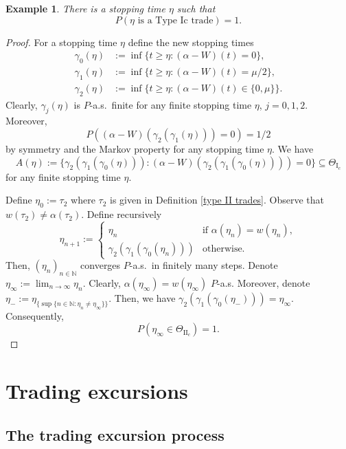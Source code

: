 \documentclass[11pt]{scrartcl}
\newtheorem{example}[theorem]{Example}
\begin{document}
\begin{example}\label{ExIc}
There is a stopping time $\eta$ such that 
\begin{equation*}
P(\eta \text{ is a Type~{Ic} trade}) = 1.
\end{equation*}
\end{example}

\begin{proof}
 For a stopping time $\eta$ define the new stopping times
  \begin{align*}
    \gamma_0(\eta) &:= \inf\{t\geq \eta: (\alpha-W)(t) = 0\}, \\
    \gamma_1(\eta) &:= \inf\{t\geq \eta: (\alpha-W)(t) = \mu/2\}, \\
    \gamma_2(\eta) &:= \inf\{t\geq \eta: (\alpha-W)(t) \in\{0,\mu\}\}.
  \end{align*}
  Clearly, $\gamma_j(\eta)$ is $P$-a.s.\ finite for any finite stopping time $\eta$, $j=0,1,2$. Moreover, $$P((\alpha-W)(\gamma_2(\gamma_1(\eta))) = 0) = 1/2$$ 
  by symmetry and the Markov property for any stopping time $\eta$. We have
$$ 
A(\eta) := \{ \gamma_2(\gamma_1(\gamma_0(\eta))):(\alpha-W)(\gamma_2(\gamma_1(\gamma_0(\eta)))) = 0 \} 
\subseteq \Theta_{\mathrm{I}_c}
$$
for any finite stopping time $\eta$. 
  
  Define $\eta_0 := \tau_2$ where $\tau_2$ is given in Definition \ref{type II trades}. 
  Observe that $w(\tau_2)\neq \alpha(\tau_2)$. Define recursively
  $$ \eta_{n+1} := 
   \begin{cases}
      \eta_n & \text{if $\alpha(\eta_n) = w(\eta_n)$}, \\
      \gamma_2(\gamma_1(\gamma_0(\eta_n))) & \text{otherwise.}
   \end{cases}
  $$
 Then, $(\eta_n)_{n\in\mathbb N}$ converges $P$-a.s.\ in finitely many steps. 
 Denote $\eta_\infty := \lim_{n\rightarrow\infty}\eta_n$. Clearly, $\alpha(\eta_\infty) = w(\eta_\infty)$ $P$-a.s. 
 Moreover, denote $\eta_- := \eta_{\{\sup\{n\in\mathbb N:\eta_n\neq \eta_\infty\}\}}$. 
 Then, we have $\gamma_2(\gamma_1(\gamma_0(\eta_-))) = \eta_\infty$. Consequently, 
  $$ P(\eta_\infty \in \Theta_{\mathrm{II}_c}) = 1. $$
\end{proof}

\section{Trading excursions}

\subsection{The trading excursion process}
\end{document}
